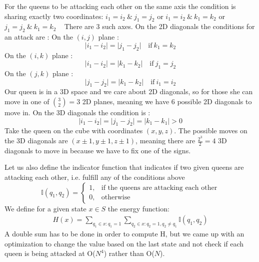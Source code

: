 \documentclass{article}
\begin{document}
For the queens to be attacking each other on the same axis the condition is sharing exactly two coordinates: \newline
$i_1 = i_2 \ \& \ j_1=j_2$ or $i_1 = i_2 \ \& \ k_1 = k_2$ or $j_1 = j_2 \ \& \ k_1 = k_2$ \ \newline
There are 3 such axes.\newline \newline
On the 2D diagonals the conditions for an attack are : \newline
On the $(i,j)$ plane : 
$$\vert i_1 - i_2 \vert = \vert j_1 - j_2\vert \quad \text{if} \ k_1 = k_2$$
On the $(i,k)$ plane : 
$$\vert i_1 - i_2 \vert = \vert k_1 - k_2\vert \quad \text{if} \ j_1 = j_2$$
On the  $(j,k)$ plane :
$$\vert j_1 - j_2 \vert = \vert k_1 - k_2\vert \quad \text{if} \ i_1 = i_2$$ 
Our queen is in a 3D space and we care about 2D diagonals, so for those she can move in one of $\binom{3}{2}=3$ 2D planes, meaning we have 6 possible 2D diagonals to move in.
\newline \newline
On the 3D diagonals the condition is : $$\vert i_1 - i_2 \vert = \vert j_1 - j_2 \vert = \vert k_1 - k_1 \vert > 0$$ 
Take the queen on the cube with coordinates $(x,y,z)$. The possible moves on the 3D diagonals are $(x \pm 1, y \pm 1, z \pm 1)$, meaning there are $\frac{2^3}{2}=4$ 3D diagonals to move in because we have to fix one of the signs. \newline 

Let us also define the indicator function that indicates if two given queens are attacking each other, i.e. fulfill any of the conditions above 
$$
\mathbb{I}(q_1,q_2)=\begin{cases}
			1, & \text{if the queens are attacking each other}\\
            0, & \text{otherwise}
		 \end{cases}
$$
\newline 
We define for a given state $x \in S$ the energy function:
\newline
\begin{align*}
H(x) = \sum_{q_1 \in x : q_1=1}{} \sum_{q_2 \in x: q_2=1,q_2 \neq q_1}{\mathbb{I}(q_1,q_2)}
\end{align*}
A double sum has to be done in order to compute H, but we came up with an optimization to change the value based on the last state and not check if each queen is being attacked at O($N^4$) rather than O($N$).
\end{document}
